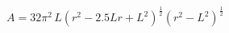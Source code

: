 \begin{equation}
A=32\pi^2\,L\left(r^{2}-2.5Lr +
L^2\right)^{\frac{1}{2}}(r^2-L^2)^{\frac{1}{2}}
\end{equation}

